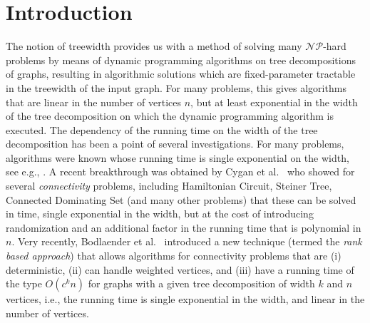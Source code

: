 \documentclass{llncs}
\begin{document}
\section{Introduction}
The notion of treewidth provides us with a method of solving many $\mathcal{NP}$-hard problems by means of
dynamic programming algorithms on tree decompositions of graphs, resulting in
algorithmic solutions which are fixed-parameter tractable in the treewidth of the
input graph. For many problems, this gives algorithms that are linear in
the number of vertices $n$, but at least exponential in the width of the tree
decomposition on which the dynamic programming algorithm is executed. 
The dependency of the running time on the width of the tree decomposition
has been a point of several investigations. For many problems, algorithms
were known whose running time is single exponential on the width,
see e.g., \cite{TelleP93}. A recent breakthrough was obtained
by Cygan et al.~\cite{CyganNPPRW11} who showed for several {\em
connectivity} problems, including {\sc Hamiltonian Circuit},
{\sc Steiner Tree}, {\sc Connected Dominating Set} (and many other problems)
that these can be solved in time, single exponential in the width, but at the
cost of introducing randomization and an additional factor in the running time that
is polynomial in $n$. Very recently, Bodlaender et al.~\cite{BodlaenderCKN12}
introduced a new technique (termed the {\em rank based approach})
that allows algorithms for connectivity problems that are
(i) deterministic, (ii) can handle weighted vertices, and (iii) have a running time
of the type $O(c^k n)$ for graphs with a given tree decomposition of width $k$
and $n$ vertices, i.e., the running time is single exponential in the width, and
linear in the number of vertices. 
\end{document}
